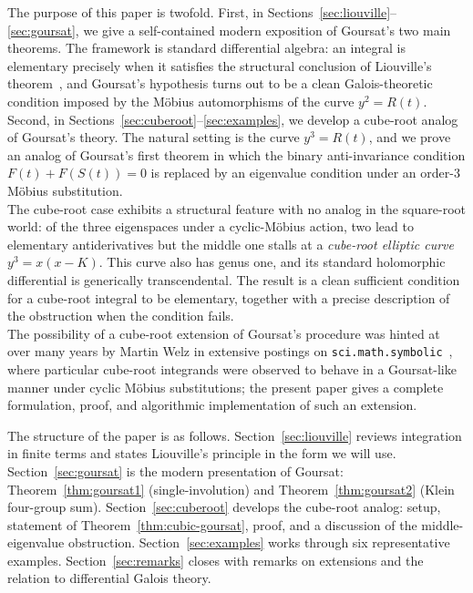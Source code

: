 \documentclass[11pt,a4paper]{article}
\theoremstyle{plain}
\theoremstyle{definition}
\theoremstyle{remark}
\begin{document}
The purpose of this paper is twofold. First, in Sections~\ref{sec:liouville}--\ref{sec:goursat}, we give a self-contained modern exposition of Goursat's two main theorems. The framework is standard differential algebra: an integral is elementary precisely when it satisfies the structural conclusion of Liouville's theorem~\cite{Rosenlicht1972}, and Goursat's hypothesis turns out to be a clean Galois-theoretic condition imposed by the M\"obius automorphisms of the curve $y^2 = R(t)$. Second, in Sections~\ref{sec:cuberoot}--\ref{sec:examples}, we develop a cube-root analog of Goursat's theory. The natural setting is the curve $y^3 = R(t)$, and we prove an analog of Goursat's first theorem in which the binary anti-invariance condition $F(t)+F(S(t))=0$ is replaced by an eigenvalue condition under an order-$3$ M\"obius substitution.\\

The cube-root case exhibits a structural feature with no analog in the square-root world: of the three eigenspaces under a cyclic-Möbius action, two lead to elementary antiderivatives but the middle one stalls at a \emph{cube-root elliptic curve} $y^3=x(x-K)$. This curve also has genus one, and its standard holomorphic differential is generically transcendental. The result is a clean sufficient condition for a cube-root integral to be elementary, together with a precise description of the obstruction when the condition fails.\\

The possibility of a cube-root extension of Goursat's procedure was hinted at over many years by Martin Welz in extensive postings on \texttt{sci.math.symbolic}~\cite{WelzNewsgroup}, where particular cube-root integrands were observed to behave in a Goursat-like manner under cyclic M\"obius substitutions; the present paper gives a complete formulation, proof, and algorithmic implementation of such an extension.

\medskip

The structure of the paper is as follows. Section~\ref{sec:liouville} reviews integration in finite terms and states Liouville's principle in the form we will use. Section~\ref{sec:goursat} is the modern presentation of Goursat: Theorem~\ref{thm:goursat1} (single-involution) and Theorem~\ref{thm:goursat2} (Klein four-group sum). Section~\ref{sec:cuberoot} develops the cube-root analog: setup, statement of Theorem~\ref{thm:cubic-goursat}, proof, and a discussion of the middle-eigenvalue obstruction. Section~\ref{sec:examples} works through six representative examples. Section~\ref{sec:remarks} closes with remarks on extensions and the relation to differential Galois theory.
\end{document}
